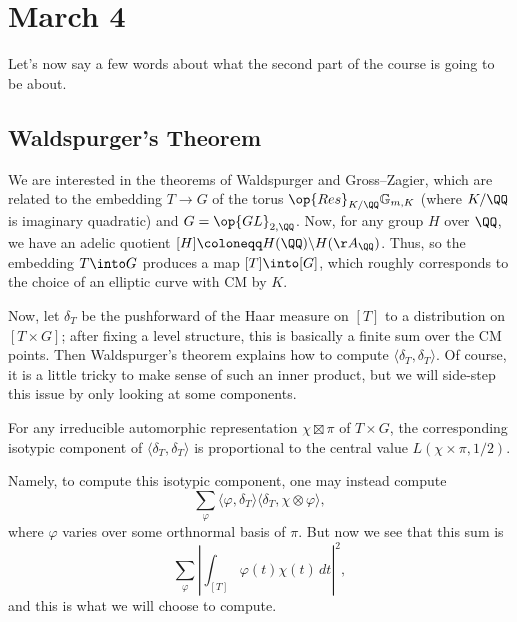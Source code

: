\documentclass[../notes.tex]{subfiles}
\begin{document}
\section{March 4}
Let's now say a few words about what the second part of the course is going to be about.

\subsection{Waldspurger's Theorem}
We are interested in the theorems of Waldspurger and Gross--Zagier, which are related to the embedding $T\to G$ of the torus $\op{Res}_{K/\QQ}\mathbb G_{m,K}$ (where $K/\QQ$ is imaginary quadratic) and $G=\op{GL}_{2,\QQ}$. Now, for any group $H$ over $\QQ$, we have an adelic quotient $[H]\coloneqq H(\QQ)\backslash H(\AA_\QQ)$. Thus, so the embedding $T\into G$ produces a map $[T]\into[G]$, which roughly corresponds to the choice of an elliptic curve with CM by $K$.

Now, let $\delta_T$ be the pushforward of the Haar measure on $[T]$ to a distribution on $[T\times G]$; after fixing a level structure, this is basically a finite sum over the CM points. Then Waldspurger's theorem explains how to compute $\langle\delta_T,\delta_T\rangle$. Of course, it is a little tricky to make sense of such an inner product, but we will side-step this issue by only looking at some components.
\begin{theorem}
	For any irreducible automorphic representation $\chi\boxtimes\pi$ of $T\times G$, the corresponding isotypic component of $\langle\delta_T,\delta_T\rangle$ is proportional to the central value $L(\chi\times\pi,1/2)$.
\end{theorem}
Namely, to compute this isotypic component, one may instead compute
\[\sum_{\varphi}\langle\varphi,\delta_T\rangle\langle\delta_T,\chi\otimes\varphi\rangle,\]
where $\varphi$ varies over some orthnormal basis of $\pi$. But now we see that this sum is
\[\sum_\varphi\left|\int_{[T]}\varphi(t)\chi(t)\,dt\right|^2,\]
and this is what we will choose to compute.
\end{document}
